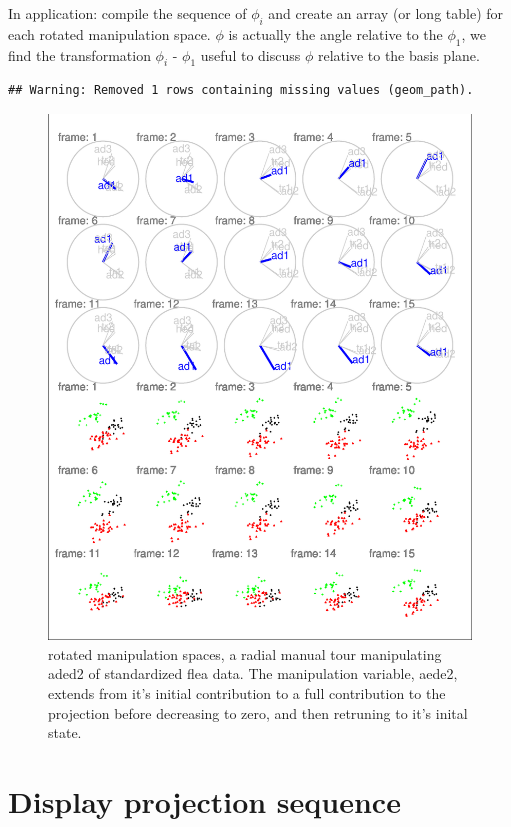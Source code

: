 \documentclass{monashthesis}
\begin{document}
In application: compile the sequence of \(\phi_i\) and create an array
(or long table) for each rotated manipulation space. \(\phi\) is
actually the angle relative to the \(\phi_1\), we find the
transformation \(\phi_i\) - \(\phi_1\) useful to discuss \(\phi\)
relative to the basis plane.

\begin{verbatim}
## Warning: Removed 1 rows containing missing values (geom_path).
\end{verbatim}

\begin{figure}
\centering
\includegraphics{thesis_files/figure-latex/step3-1.pdf}
\caption{\label{fig:step3}rotated manipulation spaces, a radial manual tour
manipulating aded2 of standardized flea data. The manipulation variable,
aede2, extends from it's initial contribution to a full contribution to
the projection before decreasing to zero, and then retruning to it's
inital state.}
\end{figure}

\section{Display projection sequence}\label{display-projection-sequence}
\end{document}
